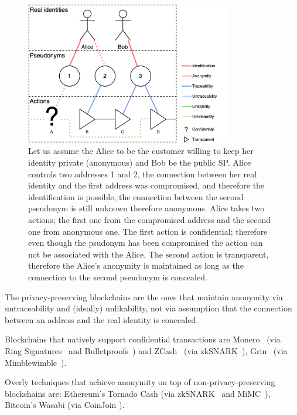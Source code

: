 \documentclass{ieeeaccess}
\begin{document}
\begin{figure}[h!]
\includegraphics[width=9cm]{anonymity-diagram.png}
\centering
\caption{Let us assume the Alice to be the customer willing to keep her identity private (anonymous) and Bob be the public SP. Alice controls two addresses 1 and 2, the connection between her real identity and the first address was compromised, and therefore the identification is possible, the connection between the second pseudonym is still unknown therefore anonymous. Alice takes two actions; the first one from the compromised address and the second one from anonymous one. The first action is confidential; therefore even though the psudonym has been compromised the action can not be associated with the Alice. The second action is transparent, therefore the Alice's anonymity is maintained as long as the connection to the second pseudonym is concealed.}

\label{fig:anonymity-diagram1}
\end{figure}


The privacy-preserving blockchains are the ones that maintain anonymity via untraceability and (ideally) unlikability, not via assumption that the connection between an address and the real identity is concealed.   

Blockchains that natively support confidential transactions are
Monero~\cite{van2013cryptonote} (via Ring Signatures~\cite{cryptoeprint:2015:1098} and Bulletproofs~\cite{Bulletpr14, bunz2018bulletproofs}) and ZCash~\cite{sasson2014zerocash} (via zkSNARK~\cite{ben2013snarks}), Grin~\cite{fuchsbauer2019aggregate} (via Mimblewimble~\cite{httpsdow19}).

Overly techniques that achieve anonymity on top of non-privacy-preserving blockchains are: Ethereum's Tornado Cash\cite{pertsev2019tornado} (via zkSNARK~\cite{groth2016size} and MiMC~\cite{albrecht2016mimc}), Bitcoin's Wasabi\cite{WasabiWa56} (via CoinJoin \cite{CoinJoin41}).
\end{document}
